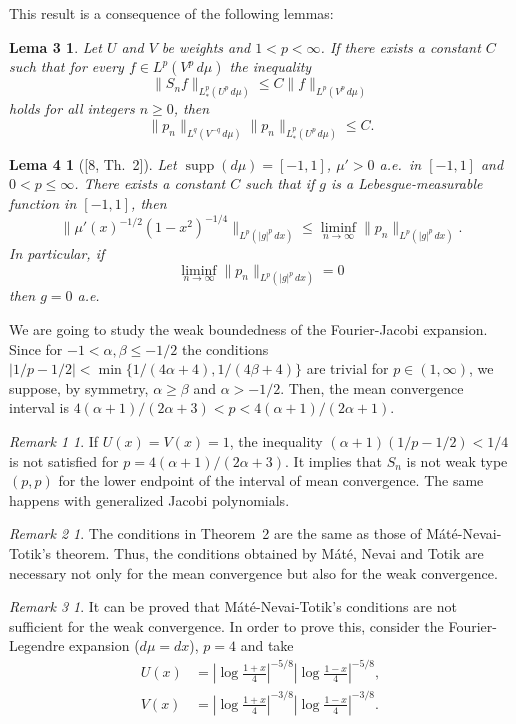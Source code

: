\documentclass[11pt,a4paper]{article}
\newcommand{\supp}{\operatorname{supp}}
\theoremstyle{plain}
\newtheorem*{lemThree}{Lema 3}
\newtheorem*{lemFour}{Lema 4}
\theoremstyle{definition}
\theoremstyle{remark}
\newtheorem*{remOne}{Remark 1}
\newtheorem*{remTwo}{Remark 2}
\newtheorem*{remThree}{Remark 3}
\begin{document}
This result is a consequence of the following lemmas:

\begin{lemThree}
Let $U$ and $V$ be weights and $1 < p < \infty$. 
If there exists a constant $C$ such that for every $f \in L^{p}(V^{p}\,d\mu)$ 
the inequality
$$
\|S_{n}f\|_{L^{p}_{*}(U^{p}\,d\mu)} \leq C\|f\|_{L^{p}(V^{p}\,d\mu)}
$$
holds for all integers $n \geq 0$, then
$$
\|p_{n}\|_{L^{q}(V^{-q}\,d\mu)} \|p_{n}\|_{L^{p}_{*}(U^{p}\,d\mu)} \leq C.
$$
\end{lemThree}

\begin{lemFour}[{[8, Th.~2]}]
Let $\supp(d\mu) = [-1,1]$, $\mu' > 0$ a.e.\ in
$[-1,1]$ and $0 < p \leq \infty$. There exists a
constant $C$ such that if $g$ is a Lebesgue-measurable function 
in $[-1,1]$, then
$$
\|\mu'(x)^{-1/2}(1-x^{2})^{-1/4}\|_{L^{p}(|g|^{p}\,dx)}
\leq \liminf_{n \to \infty} \|p_{n}\|_{L^{p}(|g|^{p}\,dx)}.
$$
In particular, if
$$
\liminf_{n \to \infty} \|p_{n}\|_{L^{p}(|g|^{p}\,dx)} = 0
$$
then $g = 0$ a.e.
\end{lemFour}

We are going to study the weak boundedness of the Fourier-Jacobi 
expansion. Since for $-1 < \alpha, \beta \leq -1/2$ 
the conditions $|1/p-1/2|< \min\{1/(4\alpha+4),1/(4\beta+4)\}$ 
are trivial for $p \in (1,\infty)$, we suppose, by symmetry, 
$\alpha \geq \beta$ and $\alpha > -1/2$. Then, 
the mean convergence interval is $4(\alpha+1)/(2\alpha+3) 
< p < 4(\alpha+1)/(2\alpha+1)$.

\begin{remOne}
If $U(x) = V(x) = 1$, the inequality $(\alpha+1)(1/p-1/2) 
< 1/4$ is not satisfied for $p = 4(\alpha+1)/(2\alpha+3)$. 
It implies that $S_{n}$ is not weak type $(p,p)$ for the lower endpoint 
of the interval of mean convergence. The same happens with generalized 
Jacobi polynomials.
\end{remOne}

\begin{remTwo}
The conditions in Theorem~2 are the same as those 
of M\'at\'e-Nevai-Totik's theorem. Thus, the conditions obtained 
by M\'at\'e, Nevai and Totik are necessary not only for the mean 
convergence but also for the weak convergence.
\end{remTwo}

\begin{remThree}
It can be proved that M\'at\'e-Nevai-Totik's conditions 
are not sufficient for the weak convergence. In order to prove 
this, consider the Fourier-Legendre expansion ($d\mu = dx$), 
$p = 4$ and take
\begin{align*}
U(x) &= \left|\log \frac{1+x}{4} \right|^{-5/8}
\left|\log \frac{1-x}{4} \right|^{-5/8}, \\
V(x) &= \left|\log \frac{1+x}{4} \right|^{-3/8}
\left|\log \frac{1-x}{4} \right|^{-3/8}.
\end{align*}
\end{remThree}
\end{document}
